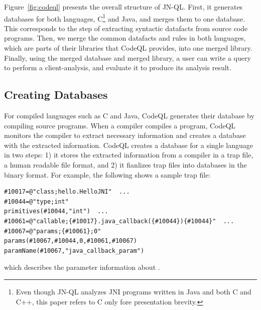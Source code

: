 Figure~\ref{fig:codeql} presents the overall structure of JN-QL.
First, it generates databases for both languages, C\footnote{
Even though JN-QL analyzes JNI programs written in Java and both C and
C++, this paper refers to C only fore presentation brevity.} and
Java, and merges them to one database.  This corresponds
to the step of extracting syntactic datafacts from source code programs.
Then, we merge the common datafacts and rules in both languages,
which are parts of their libraries that CodeQL provides, into one merged library.
Finally, using the merged database and merged library, a user can write a query to
perform a client-analysis, and evaluate it to produce its analysis result.

\subsection{Creating Databases}
For compiled languages such as C and Java, CodeQL generates their database
by compiling source programs.  When a compiler compiles a program,
CodeQL monitors the compiler to extract necessary information and
creates a database with the extracted information.
CodeQL creates a database for a single language in two steps:
1) it stores the extracted information from a compiler in a trap
file, a human readable file format, and 2) it fianlizes trap files
into databases in the binary format. For example, the
following shows a sample trap file:

\begin{lstlisting}[style=java,numbers=none]
#10017=@"class;hello.HelloJNI"  ...
#10044=@"type;int"
primitives(#10044,"int")  ...
#10061=@"callable;{#10017}.java_callback({#10044}){#10044}"  ...
#10067=@"params;{#10061};0"
params(#10067,#10044,0,#10061,#10067)
paramName(#10067,"java_callback_param")
\end{lstlisting}
which describes the parameter information about .

